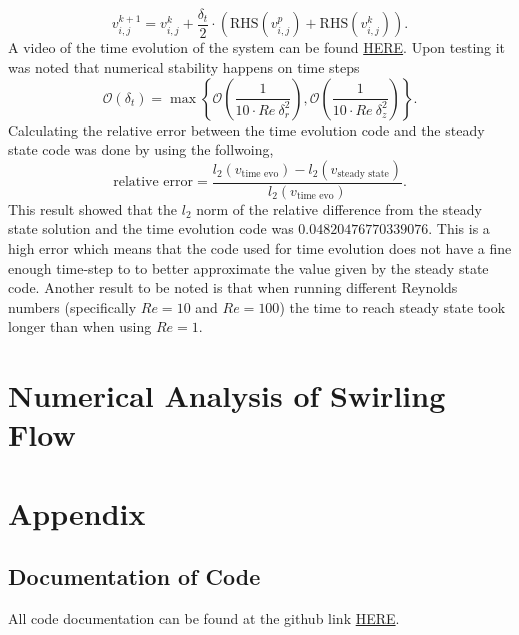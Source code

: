 \documentclass[11pt,letterpaper]{article}
\newcommand{\fpar}[1]{\left({#1}\right)} %
\newcommand{\fset}[1]{\left\{{#1}\right\}} %
\begin{document}
\begin{equation}\label{eq:Correct}
    v^{k+1}_{i,j} = v^k_{i,j} + \dfrac{\delta_t}{2} \cdot\fpar{\text{RHS}\fpar{v^p_{i,j}}+ \text{RHS}\fpar{v^k_{i,j}}}.
\end{equation}
A video of the time evolution of the system can be found  \href{https://youtu.be/zd8_BHrUcXo}{HERE}.
\newline
Upon testing it was noted that numerical stability happens on time steps
\begin{equation*}
    \mathcal{O}(\delta_t) = \max\fset{\mathcal{O}\fpar{\dfrac{1}{10\cdot Re \ \delta_r^2}},\mathcal{O}\fpar{\dfrac{1}{10\cdot Re \ \delta_z^2}}}.
\end{equation*}
Calculating the relative error between the time evolution code and the steady state code was done by using the follwoing,
\begin{equation*}
    \text{relative error} = \dfrac{l_{2}\fpar{v_{\text{time evo}}} - l_{2}\fpar{ v_{\text{steady state}}}}{l_{2}\fpar{v_{\text{time evo}}}}.
\end{equation*}
This result showed that the $l_2$ norm of the relative difference from the steady state solution and the time evolution code was $0.04820476770339076$. This is a high error which means that the code used for time evolution does not have a fine enough time-step to to better approximate the value given by the steady state code.
Another result to be noted is that when running different Reynolds numbers (specifically $Re = 10$ and $Re = 100$) the time to reach steady state took longer than when using $Re = 1$.



\section{Numerical Analysis of Swirling Flow}

\section{Appendix}
\subsection{Documentation of Code}
All code documentation can be found at the github link   \href{https://github.com/Thesaxman1126/MAT-462-Project}{HERE}.
\end{document}
